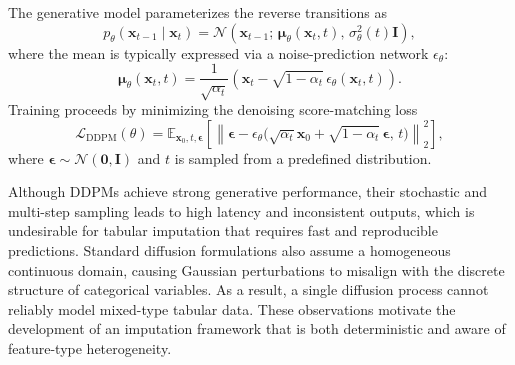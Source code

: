 \documentclass[times, review, 10pt]{elsarticle}
\begin{document}
The generative model parameterizes the reverse transitions as
\begin{equation}
p_\theta(\mathbf{x}_{t-1} \mid \mathbf{x}_t)
= \mathcal{N}\!\left(
\mathbf{x}_{t-1};
\,\boldsymbol{\mu}_\theta(\mathbf{x}_t, t),\,
\sigma_\theta^2(t)\mathbf{I}
\right),
\label{eq:ddpm-reverse}
\end{equation}
where the mean is typically expressed via a noise-prediction network $\epsilon_\theta$:
\begin{equation}
\boldsymbol{\mu}_\theta(\mathbf{x}_t, t)
= \frac{1}{\sqrt{\alpha_t}}
\left(
\mathbf{x}_t - \sqrt{1-\alpha_t}\,\epsilon_\theta(\mathbf{x}_t, t)
\right).
\label{eq:ddpm-mu}
\end{equation}
Training proceeds by minimizing the denoising score-matching loss
\begin{equation}
\mathcal{L}_{\text{DDPM}}(\theta)
= \mathbb{E}_{\mathbf{x}_0,t,\boldsymbol{\epsilon}}
\left[
\left\|
\boldsymbol{\epsilon}
- \epsilon_\theta\big(\sqrt{\alpha_t}\mathbf{x}_0
+ \sqrt{1-\alpha_t}\,\boldsymbol{\epsilon},\, t\big)
\right\|_2^2
\right],
\label{eq:ddpm-loss}
\end{equation}
where $\boldsymbol{\epsilon} \sim \mathcal{N}(\mathbf{0},\mathbf{I})$ and $t$ is sampled from a predefined distribution.

Although DDPMs achieve strong generative performance, their stochastic and
multi-step sampling leads to high latency and inconsistent outputs, which is
undesirable for tabular imputation that requires fast and reproducible
predictions. Standard diffusion formulations also assume a homogeneous
continuous domain, causing Gaussian perturbations to misalign with the
discrete structure of categorical variables. As a result, a single diffusion
process cannot reliably model mixed-type tabular data. These observations
motivate the development of an imputation framework that is both
deterministic and aware of feature-type heterogeneity.


\end{document}
